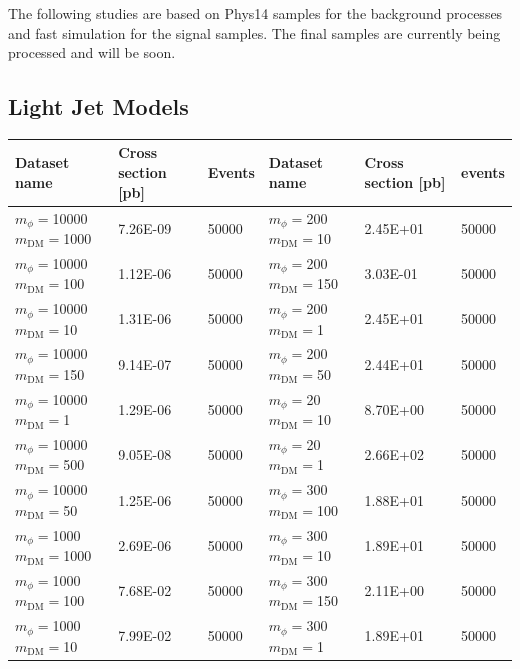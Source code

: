The following studies are based on Phys14 samples for the background processes and fast simulation for the signal samples. The final samples are currently being processed and will be soon.
\subsection{Light Jet Models}

\begin{table}[]
\centering
\small
\begin{tabular}{lll||lll}
\hline
Dataset name        & Cross section [pb]  & Events    & Dataset name  & Cross section [pb]  & events           \\\hline
$m_\phi=$10000 $m_\textrm{DM}=$1000 & 7.26E-09     & 50000                  &  $m_\phi=$200 $m_\textrm{DM}=$10     & 2.45E+01     & 50000                  \\ 
$m_\phi=$10000 $m_\textrm{DM}=$100  & 1.12E-06     & 50000                  &  $m_\phi=$200 $m_\textrm{DM}=$150    & 3.03E-01     & 50000                  \\ 
$m_\phi=$10000 $m_\textrm{DM}=$10   & 1.31E-06     & 50000                  &  $m_\phi=$200 $m_\textrm{DM}=$1      & 2.45E+01     & 50000                  \\ 
$m_\phi=$10000 $m_\textrm{DM}=$150  & 9.14E-07     & 50000                  &  $m_\phi=$200 $m_\textrm{DM}=$50     & 2.44E+01     & 50000                  \\ 
$m_\phi=$10000 $m_\textrm{DM}=$1    & 1.29E-06     & 50000                  &  $m_\phi=$20 $m_\textrm{DM}=$10      & 8.70E+00     & 50000                  \\ 
$m_\phi=$10000 $m_\textrm{DM}=$500  & 9.05E-08     & 50000                  &  $m_\phi=$20 $m_\textrm{DM}=$1       & 2.66E+02     & 50000                  \\ 
$m_\phi=$10000 $m_\textrm{DM}=$50   & 1.25E-06     & 50000                  &  $m_\phi=$300 $m_\textrm{DM}=$100    & 1.88E+01     & 50000                  \\ 
$m_\phi=$1000 $m_\textrm{DM}=$1000  & 2.69E-06     & 50000                  &  $m_\phi=$300 $m_\textrm{DM}=$10     & 1.89E+01     & 50000                  \\ 
$m_\phi=$1000 $m_\textrm{DM}=$100   & 7.68E-02     & 50000                  &  $m_\phi=$300 $m_\textrm{DM}=$150    & 2.11E+00     & 50000                  \\ 
$m_\phi=$1000 $m_\textrm{DM}=$10    & 7.99E-02     & 50000                  &  $m_\phi=$300 $m_\textrm{DM}=$1      & 1.89E+01     & 50000                  \\ 

\end{tabular}
\end{table}
